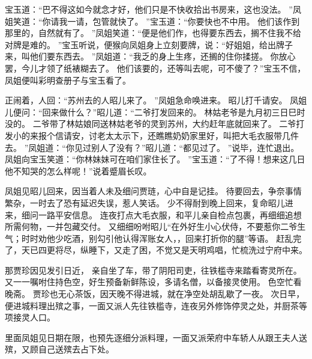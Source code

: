宝玉道：“巴不得这如今就念才好，他们只是不快收拾出书房来，这也没法。
”凤姐笑道：“你请我一请，包管就快了。
”宝玉道：“你要快也不中用。
他们该作到那里的，自然就有了。
”凤姐笑道：“便是他们作，也得要东西去，搁不住我不给对牌是难的。
”宝玉听说，便猴向凤姐身上立刻要牌，说：“好姐姐，给出牌子来，叫他们要东西去。
”凤姐道：“我乏的身上生疼，还搁的住你揉搓。
你放心罢，今儿才领了纸裱糊去了。
他们该要的，还等叫去呢，可不傻了？”宝玉不信，凤姐便叫彩明查册子与宝玉看了。
\par
正闹着，人回：“苏州去的人昭儿来了。
”凤姐急命唤进来。
昭儿打千请安。
凤姐儿便问：“回来做什么？”昭儿道：“二爷打发回来的。
林姑老爷是九月初三日巳时没的。
二爷带了林姑娘同送林姑老爷的灵到苏州，大约赶年底就回来了。
二爷打发小的来报个信请安，讨老太太示下，还瞧瞧奶奶家里好，叫把大毛衣服带几件去。
”凤姐道：“你见过别人了没有？”昭儿道：“都见过了。
”说毕，连忙退出。
凤姐向宝玉笑道：“你林妹妹可在咱们家住长了。
”宝玉道：“了不得！想来这几日他不知哭的怎么样呢！”说着蹙眉长叹。
\par
凤姐见昭儿回来，因当着人未及细问贾琏，心中自是记挂。
待要回去，争奈事情繁杂，一时去了恐有延迟失误，惹人笑话。
少不得耐到晚上回来，复命昭儿进来，细问一路平安信息。
连夜打点大毛衣服，和平儿亲自检点包裹，再细细追想所需何物，一并包藏交付。
又细细吩咐昭儿“在外好生小心伏侍，不要惹你二爷生气；时时劝他少吃酒，别勾引他认得浑账女人，，回来打折你的腿”等语。
赶乱完了，天已四更将尽，纵睡下，又走了困，不觉又是天明鸡唱，忙梳洗过宁府中来。
\par
那贾珍因见发引日近，
亲自坐了车，带了阴阳司吏，往铁槛寺来踏看寄灵所在。
又一一嘱咐住持色空，好生预备新鲜陈设，多请名僧，以备接灵使用。
色空忙看晚斋。
贾珍也无心茶饭，因天晚不得进城，就在净空处胡乱歇了一夜。
次日早，便进城料理出殡之事，一面又派人先往铁槛寺，连夜另外修饰停灵之处，并厨茶等项接灵人口。
\par
里面凤姐见日期在限，也预先逐细分派料理，一面又派荣府中车轿人从跟王夫人送殡，又顾自己送殡去占下处。
